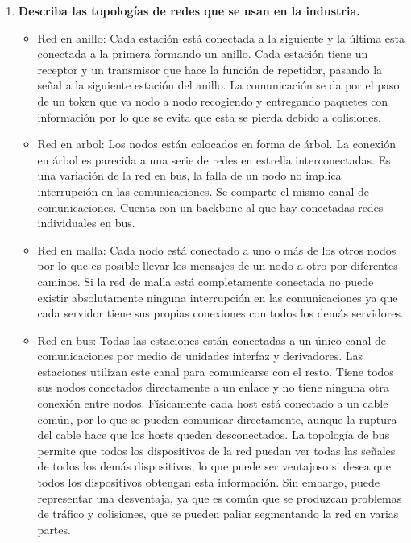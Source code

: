 \documentclass[10pt,a4paper,spanish]{article}
\begin{document}
\begin{enumerate}
    \newpage
    \item \textbf{Describa las topologías de redes que se usan en la industria.}

    \begin{itemize}
      \item Red en anillo: Cada estación está conectada a la siguiente y la última esta conectada a la primera formando un anillo. Cada estación tiene un receptor y un transmisor que hace la función de repetidor, pasando la señal a la siguiente estación del anillo. La comunicación se da por el paso de un token que va nodo a nodo recogiendo y entregando paquetes con información por lo que se evita que esta se pierda debido a colisiones.

      \item Red en arbol: Los nodos están colocados en forma de árbol. La conexión en árbol es parecida a una serie de redes en estrella interconectadas. Es una variación de la red en bus, la falla de un nodo no implica interrupción en las comunicaciones. Se comparte el mismo canal de comunicaciones. Cuenta con un backbone al que hay conectadas redes individuales en bus.

      \item Red en malla: Cada nodo está conectado a uno o más de los otros nodos por lo que es posible llevar los mensajes de un nodo a otro por diferentes caminos. Si la red de malla está completamente conectada no puede existir absolutamente ninguna interrupción en las comunicaciones ya que cada servidor tiene sus propias conexiones con todos los demás servidores.

      \item Red en bus: Todas las estaciones están conectadas a un único canal de comunicaciones por medio de unidades interfaz y derivadores. Las estaciones utilizan este canal para comunicarse con el resto. Tiene todos sus nodos conectados directamente a un enlace y no tiene ninguna otra conexión entre nodos. Físicamente cada host está conectado a un cable común, por lo que se pueden comunicar directamente, aunque la ruptura del cable hace que los hosts queden desconectados. La topología de bus permite que todos los dispositivos de la red puedan ver todas las señales de todos los demás dispositivos, lo que puede ser ventajoso si desea que todos los dispositivos obtengan esta información. Sin embargo, puede representar una desventaja, ya que es común que se produzcan problemas de tráfico y colisiones, que se pueden paliar segmentando la red en varias partes.


\end{itemize}
\end{enumerate}
\end{document}
